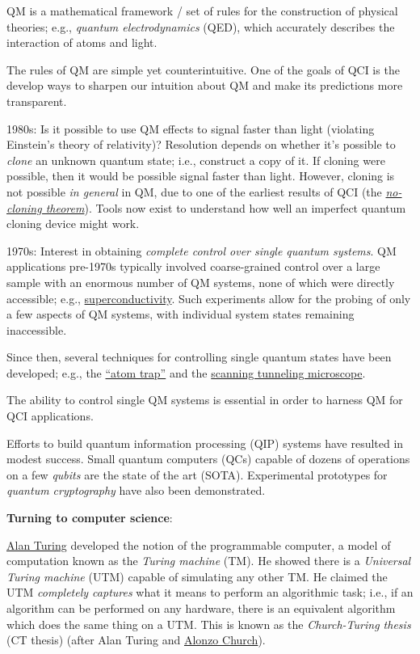 \documentclass{article}
\begin{document}
QM is a mathematical framework / set of rules for the construction of physical theories; e.g., \textit{quantum electrodynamics} (QED), which accurately describes the interaction of atoms and light.

The rules of QM are simple yet counterintuitive. One of the goals of QCI is the develop ways to sharpen our intuition about QM and make its predictions more transparent.

1980s: Is it possible to use QM effects to signal faster than light (violating Einstein's theory of relativity)? Resolution depends on whether it's possible to \textit{clone} an unknown quantum state; i.e., construct a copy of it. If cloning were possible, then it would be possible signal faster than light. However, cloning is not possible \textit{in general} in QM, due to one of the earliest results of QCI (the \href{https://en.wikipedia.org/wiki/No-cloning_theorem}{\textit{no-cloning theorem}}). Tools now exist to understand how well an imperfect quantum cloning device might work.

1970s: Interest in obtaining \textit{complete control over single quantum systems}. QM applications pre-1970s typically involved coarse-grained control over a large sample with an enormous number of QM systems, none of which were directly accessible; e.g., \href{https://en.wikipedia.org/wiki/Superconductivity}{superconductivity}. Such experiments allow for the probing of only a few aspects of QM systems, with individual system states remaining inaccessible.

Since then, several techniques for controlling single quantum states have been developed; e.g., the \href{https://en.wikipedia.org/wiki/Magnetic_trap_(atoms)}{``atom trap''} and the \href{https://en.wikipedia.org/wiki/Scanning_tunneling_microscope}{scanning tunneling microscope}.

The ability to control single QM systems is essential in order to harness QM for QCI applications.

Efforts to build quantum information processing (QIP) systems have resulted in modest success. Small quantum computers (QCs) capable of dozens of operations on a few \textit{qubits} are the state of the art (SOTA). Experimental prototypes for \textit{quantum cryptography} have also been demonstrated.

\textbf{Turning to computer science}:

\href{https://en.wikipedia.org/wiki/Alan_Turing}{Alan Turing} developed the notion of the programmable computer, a model of computation known as the \textit{Turing machine} (TM). He showed there is a \textit{Universal Turing machine} (UTM) capable of simulating any other TM. He claimed the UTM \textit{completely captures} what it means to perform an algorithmic task; i.e., if an algorithm can be performed on any hardware, there is an equivalent algorithm which does the same thing on a UTM. This is known as the \textit{Church-Turing thesis} (CT thesis) (after Alan Turing and \href{https://en.wikipedia.org/wiki/Alonzo_Church}{Alonzo Church}).
\end{document}
